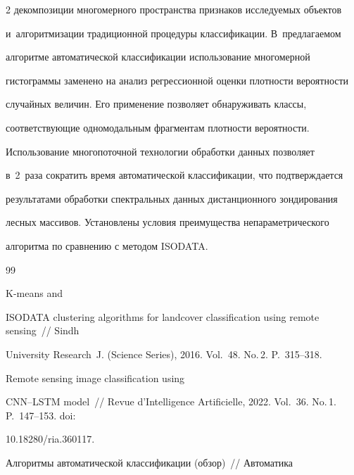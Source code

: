 \begin{multicols}{2}
декомпозиции многомерного пространства признаков исследуемых объектов 


и~алгоритмизации традиционной процедуры классификации. В~пред\-ла\-га\-емом 


алгоритме автоматической классификации использование многомерной 


гистограммы заменено на анализ регрессионной оценки плот\-ности ве\-ро\-ят\-ности 


случайных величин. Его применение позволяет обнаруживать классы, 


соответствующие одномодальным фрагментам плот\-ности ве\-ро\-ят\-ности. 


Использование многопоточной технологии обработки данных поз\-во\-ля\-ет 


в~2~раза сократить время автоматической классификации, что под\-тверж\-да\-ет\-ся 


результатами обработки спект\-раль\-ных данных дистанционного зондирования 


лесных массивов. Установлены условия преимущества непараметрического 


алгоритма по сравнению с методом ISODATA.





{\small\frenchspacing


 {\baselineskip=10.6pt




 \begin{thebibliography}{99}




 K-means and 


ISODATA clustering algorithms for landcover classification using remote sensing~// Sindh 


University Research~J. (Science Series), 2016. Vol.~48. No.\,2. P.~315--318.




 Remote sensing image classification using 


CNN--LSTM model~// Revue d'Intelligence Artificielle, 2022. Vol.~36. No.\,1. P.~147--153. doi: 


10.18280/ria.360117.




 Алгоритмы автоматической классификации (обзор)~// Автоматика 



\end{thebibliography}}}
\end{multicols}
